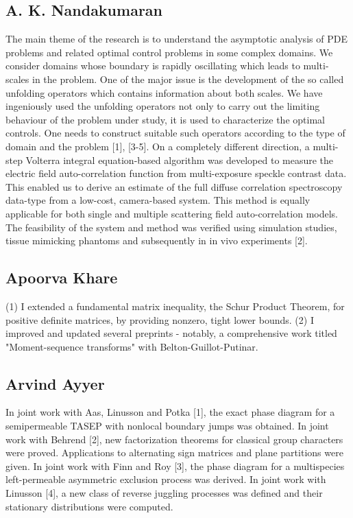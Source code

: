\subsection{A. K. Nandakumaran}

The main theme of the research is to understand the asymptotic analysis of  PDE problems and related optimal control problems in some complex domains. We consider domains whose boundary is rapidly oscillating which  leads to multi-scales in the problem. One of the major issue is the development of the so called unfolding operators which contains information about both scales. We have ingeniously used the unfolding operators not only to carry out the limiting behaviour of the problem under study, it is used to characterize the optimal controls. One needs to construct suitable such operators according to the type of domain and the problem [1], [3-5]. On a completely different direction, a multi-step Volterra integral equation-based algorithm was developed to measure the electric field auto-correlation function from multi-exposure speckle contrast data. This enabled us to derive an estimate of the full diffuse correlation spectroscopy data-type from a low-cost, camera-based system. This method is equally applicable for both single and multiple scattering field auto-correlation models. The feasibility of the system and method was verified using simulation studies, tissue mimicking phantoms and subsequently in in vivo experiments [2]. 


\subsection{Apoorva Khare}

(1) I extended a fundamental matrix inequality, the Schur Product Theorem, for positive definite matrices, by providing nonzero, tight lower bounds. (2) I improved and updated several preprints - notably, a comprehensive work titled "Moment-sequence transforms" with Belton-Guillot-Putinar.


\subsection{Arvind Ayyer}

In joint work with Aas, Linusson and Potka [1], the exact phase diagram for a semipermeable TASEP with nonlocal boundary jumps was obtained. In joint work with Behrend [2], new factorization theorems for classical group characters were proved. Applications to alternating sign matrices and plane partitions were given. In joint work with Finn and Roy [3], the phase diagram for a multispecies left-permeable asymmetric exclusion process was derived. In joint work with Linusson [4], a new class of reverse juggling processes was defined and their stationary distributions were computed. 


